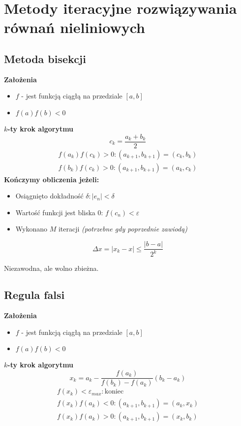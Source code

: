 \documentclass[../mn-notatki.tex]{subfiles}
\begin{document}
\section{Metody iteracyjne rozwiązywania równań nieliniowych}

\subsection{Metoda bisekcji}

\begin{tcolorbox}
\textbf{Założenia}
\begin{itemize}
    \item $f$ - jest funkcją ciągłą na przedziale $[a,b]$
    \item $f(a)f(b) < 0$\\
\end{itemize}

\textbf{$k$-ty krok algorytmu}
\[
c_k = \frac{a_k + b_k}{2}
\]
\begin{gather*}
f(a_k)f(c_k) > 0 : (a_{k+1}, b_{k+1}) = (c_k, b_k)\\
f(b_k)f(c_k) > 0 : (a_{k+1}, b_{k+1}) = (a_k, c_k)
\end{gather*}
\textbf{Kończymy obliczenia jeżeli:}
\begin{itemize}
    \item Osiągnięto dokładność $\delta: |e_n| < \delta$
    \item Wartość funkcji jest bliska $0$: $f(c_n) < \varepsilon$
    \item Wykonano $M$ iteracji \textit{(potrzebne gdy poprzednie zawiodą)}\\
\end{itemize}
\[
\Delta x = |x_k - x| \leqslant \frac{|b - a|}{2^k}
\]

Niezawodna, ale wolno zbieżna.
\end{tcolorbox}

\subsection{Regula falsi}

\begin{tcolorbox}
\textbf{Założenia}
\begin{itemize}
    \item $f$ - jest funkcją ciągłą na przedziale $[a,b]$
    \item $f(a)f(b) < 0$\\
\end{itemize}

\textbf{$k$-ty krok algorytmu}
\[
x_k = a_k - \frac{f(a_k)}{f(b_k) - f(a_k)}(b_k - a_k)
\]
\begin{gather*}
f(x_k) < \varepsilon_{max} : \text{koniec}\\
f(x_k)f(a_k) < 0 : (a_{k+1}, b_{k+1}) = (a_k, x_k)\\
f(x_k)f(a_k) > 0 : (a_{k+1}, b_{k+1}) = (x_k, b_k)
\end{gather*}

\end{tcolorbox}
\end{document}
